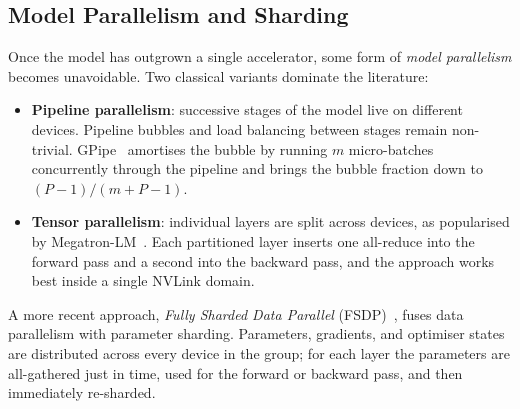 \subsection{Model Parallelism and Sharding}\label{sec:mp_bg}
Once the model has outgrown a single accelerator, some form of
\emph{model parallelism} becomes unavoidable. Two classical variants
dominate the literature:
\begin{itemize}
    \item \textbf{Pipeline parallelism}: successive stages of the
          model live on different devices. Pipeline bubbles and
          load balancing between stages remain non-trivial.
          GPipe~\cite{huang2019gpipe} amortises the bubble by
          running $m$ micro-batches concurrently through the
          pipeline and brings the bubble fraction down to
          $(P-1)/(m+P-1)$.
    \item \textbf{Tensor parallelism}: individual layers are split
          across devices, as popularised by
          Megatron-LM~\cite{shoeybi2019megatron}. Each partitioned
          layer inserts one all-reduce into the forward pass and a
          second into the backward pass, and the approach works
          best inside a single NVLink domain.
\end{itemize}
A more recent approach, \emph{Fully Sharded Data Parallel}
(FSDP)~\cite{zhao2023pytorch}, fuses data parallelism with
parameter sharding. Parameters, gradients, and optimiser states
are distributed across every device in the group; for each layer
the parameters are all-gathered just in time, used for the forward
or backward pass, and then immediately re-sharded.

